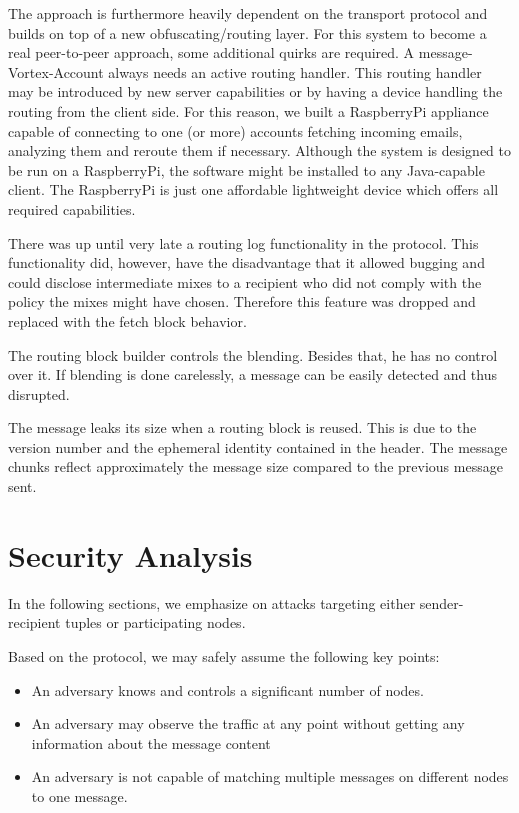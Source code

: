 The approach is furthermore heavily dependent on the transport protocol and builds on top of a new obfuscating/routing layer. For this system to become a real peer-to-peer approach, some additional quirks are required. A message-Vortex-Account always needs an active routing handler. This routing handler may be introduced by new server capabilities or by having a device handling the routing from the client side. For this reason, we built a RaspberryPi appliance capable of connecting to one (or more) accounts fetching incoming emails, analyzing them and reroute them if necessary. Although the system is designed to be run on a RaspberryPi, the software might be installed to any Java-capable client. The RaspberryPi is just one affordable lightweight device which offers all required capabilities.

There was up until very late a routing log functionality in the protocol. This functionality did, however, have the disadvantage that it allowed bugging and could disclose intermediate mixes to a recipient who did not comply with the policy the mixes might have chosen. Therefore this feature was dropped and replaced with the fetch block behavior.

The routing block builder controls the blending. Besides that, he has no control over it. If blending is done carelessly, a message can be easily detected and thus disrupted.

The message leaks its size when a routing block is reused.  This is due to the version number and the ephemeral identity contained in the header. The message chunks reflect approximately the message size compared to the previous message sent.

\chapter{Security Analysis}
In the following sections, we emphasize on attacks targeting either sender-recipient tuples or participating nodes. 

Based on the protocol, we may safely assume the following key points:
\begin{itemize}
	\item An adversary knows and controls a significant number of nodes.
	\item An adversary may observe the traffic at any point without getting any information about the message content
	\item An adversary is not capable of matching multiple messages on different nodes to one message.
\end{itemize}

